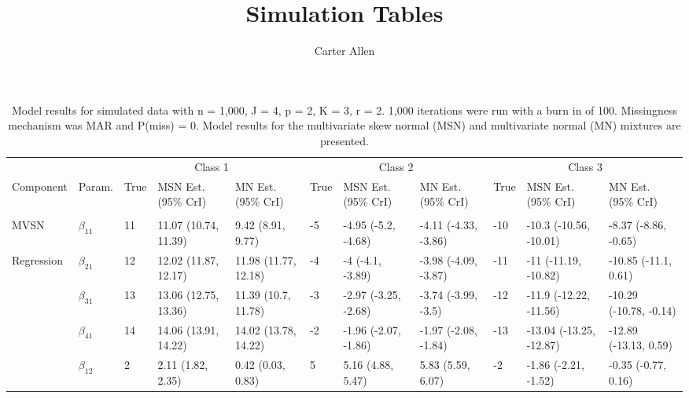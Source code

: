 \documentclass[]{article}
\title{Simulation Tables}
\author{Carter Allen}
\date{}
\begin{document}
\maketitle

\begin{landscape}\begin{table}[t]

\caption{\label{tab:unnamed-chunk-5}Model results for simulated data with n = 1,000, J = 4, p = 2, K = 3, r = 2. 1,000 iterations were run with a burn in of 100. Missingness mechanism was MAR and P(miss) = 0. Model results for the multivariate skew normal (MSN) and multivariate normal (MN) mixtures are presented.}
\centering
\fontsize{7}{9}\selectfont
\begin{tabular}{lllllllllll}
\toprule
\multicolumn{2}{c}{ } & \multicolumn{3}{c}{Class 1} & \multicolumn{3}{c}{Class 2} & \multicolumn{3}{c}{Class 3} \\
\cmidrule(l{3pt}r{3pt}){3-5} \cmidrule(l{3pt}r{3pt}){6-8} \cmidrule(l{3pt}r{3pt}){9-11}
Component & Param. & True & MSN Est. (95\% CrI) & MN Est. (95\% CrI)  & True & MSN Est. (95\% CrI) & MN Est. (95\% CrI) & True & MSN Est. (95\% CrI) & MN Est. (95\% CrI)\\
\midrule
\addlinespace[0.3em]
\multicolumn{11}{l}{\textbf{ }}\\
\hspace{1em}MVSN & $\beta_{11}$ & 11 & 11.07 (10.74, 11.39) & 9.42 (8.91, 9.77) & -5 & -4.95 (-5.2, -4.68) & -4.11 (-4.33, -3.86) & -10 & -10.3 (-10.56, -10.01) & -8.37 (-8.86, -0.65)\\
\hspace{1em}Regression & $\beta_{21}$ & 12 & 12.02 (11.87, 12.17) & 11.98 (11.77, 12.18) & -4 & -4 (-4.1, -3.89) & -3.98 (-4.09, -3.87) & -11 & -11 (-11.19, -10.82) & -10.85 (-11.1, 0.61)\\
\hspace{1em} & $\beta_{31}$ & 13 & 13.06 (12.75, 13.36) & 11.39 (10.7, 11.78) & -3 & -2.97 (-3.25, -2.68) & -3.74 (-3.99, -3.5) & -12 & -11.9 (-12.22, -11.56) & -10.29 (-10.78, -0.14)\\
\hspace{1em} & $\beta_{41}$ & 14 & 14.06 (13.91, 14.22) & 14.02 (13.78, 14.22) & -2 & -1.96 (-2.07, -1.86) & -1.97 (-2.08, -1.84) & -13 & -13.04 (-13.25, -12.87) & -12.89 (-13.13, 0.59)\\
\hspace{1em} & $\beta_{12}$ & 2 & 2.11 (1.82, 2.35) & 0.42 (0.03, 0.83) & 5 & 5.16 (4.88, 5.47) & 5.83 (5.59, 6.07) & -2 & -1.86 (-2.21, -1.52) & -0.35 (-0.77, 0.16)\\

\end{tabular}
\end{table}
\end{landscape}
\end{document}
